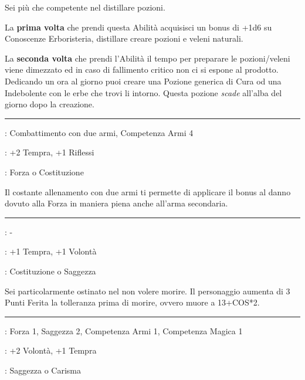 \begin{multicols}{2}
Sei più che competente nel distillare pozioni.

La \textbf{prima volta} che prendi questa Abilità acquisisci un bonus di +1d6 su Conoscenze Erboristeria, distillare creare pozioni e veleni naturali.

La \textbf{seconda volta} che prendi l'Abilità il tempo per preparare le pozioni/veleni viene dimezzato ed in caso di fallimento critico non ci si espone al prodotto. Dedicando un ora al giorno puoi creare una Pozione generica di Cura od una Indebolente con le erbe che trovi li intorno. Questa pozione \emph{scade} all'alba del giorno dopo la creazione.

\smallskip\noindent\rule{\linewidth}{2pt} \hypertarget{Doppia porzione}{}\medskip{}
\noindent
\begin{description}[noitemsep, topsep=0pt, parsep=0pt, partopsep=0pt, leftmargin=0cm, labelwidth=2.5cm]
    \item[\textbf{Requisito}]: Combattimento con due armi, Competenza Armi 4
    \item[\textbf{Tiri Salvezza}]: +2 Tempra, +1 Riflessi
    \item[\textbf{Caratteristica}]: Forza o Costituzione
\end{description}

Il costante allenamento con due armi ti permette di applicare il bonus al danno dovuto alla Forza in maniera piena anche all'arma secondaria.

\smallskip\noindent\rule{\linewidth}{2pt} \hypertarget{Duro a morire}{}\medskip{}\label{Duro a morire}
\noindent
\begin{description}[noitemsep, topsep=0pt, parsep=0pt, partopsep=0pt, leftmargin=0cm, labelwidth=2.5cm]
    \item[\textbf{Requisito}]: -
    \item[\textbf{Tiri Salvezza}]: +1 Tempra, +1 Volontà
    \item[\textbf{Caratteristica}]: Costituzione o Saggezza
\end{description}

Sei particolarmente ostinato nel non volere morire. Il personaggio aumenta di 3 Punti Ferita la tolleranza prima di morire, ovvero muore a 13+COS*2.

\smallskip\noindent\rule{\linewidth}{2pt} \hypertarget{Energia Psichica}{}\medskip{}
\noindent
\begin{description}[noitemsep, topsep=0pt, parsep=0pt, partopsep=0pt, leftmargin=0cm, labelwidth=2.5cm]
    \item[\textbf{Requisito}]: Forza 1, Saggezza 2, Competenza Armi 1, Competenza Magica 1
    \item[\textbf{Tiri Salvezza}]: +2 Volontà, +1 Tempra
    \item[\textbf{Caratteristica}]: Saggezza o Carisma
\end{description}


\end{multicols}
